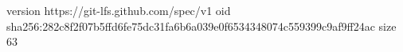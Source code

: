 version https://git-lfs.github.com/spec/v1
oid sha256:282c8f2f07b5ffd6fe75dc31fa6b6a039e0f6534348074c559399c9af9ff24ac
size 63

